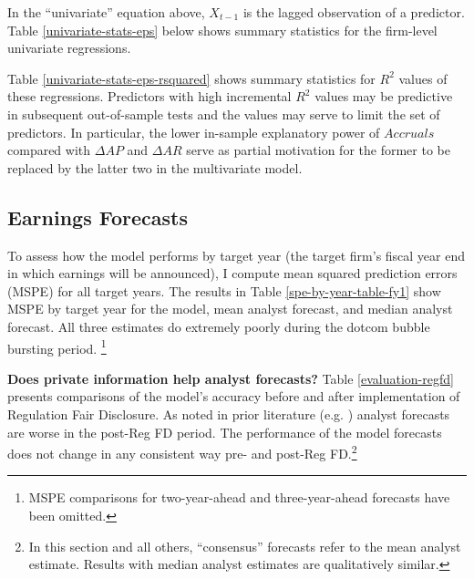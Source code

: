 \documentclass[12pt, letterpaper]{article}
\begin{document}
In the ``univariate'' equation above, $X_{t-1}$ is the lagged observation of a predictor. Table 
\ref{univariate-stats-eps} below shows summary statistics for the firm-level univariate 
regressions. 

Table \ref{univariate-stats-eps-rsquared} shows summary statistics for $R^2$ values of
these regressions. Predictors with high incremental $R^2$ values may be predictive in subsequent 
out-of-sample tests and the values may serve to limit the set of predictors. In particular, the 
lower in-sample explanatory power of $Accruals$ compared with $\Delta AP$ and $\Delta AR$ serve as
partial motivation for the former to be replaced by the latter two in the multivariate model.

\subsection{Earnings Forecasts}
To assess how the model performs by target year (the target firm's fiscal year end in which 
earnings will be announced), 
I compute mean squared prediction errors (MSPE) for all target years. The 
results in Table \ref{spe-by-year-table-fy1} show MSPE by target year for the model, mean analyst 
forecast, and median analyst forecast. All three estimates do extremely poorly during the dotcom
bubble bursting period. \footnote{MSPE comparisons for two-year-ahead and three-year-ahead 
forecasts have been omitted.}
%
%

  
\textbf{Does private information help analyst forecasts?} Table \ref{evaluation-regfd} presents
comparisons of the model's accuracy before and after implementation of Regulation Fair Disclosure. 
As noted in prior literature (e.g. \cite{gintschelmarkov2004}) analyst forecasts are worse in the 
post-Reg FD period. The performance of the model forecasts does not change in any consistent way
pre- and post-Reg FD.\footnote{In this section and all others, ``consensus'' forecasts refer to the
mean analyst estimate. Results with median analyst estimates are qualitatively similar.}
\end{document}
